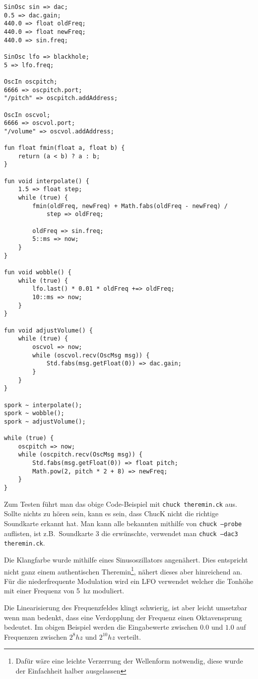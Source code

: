 \documentclass[a4paper, fontsize=12pt, toc=bibliographynumbered]{scrreprt}
\newcommand{\mono}[1]{\texttt{#1}}
\begin{document}
\begin{verbatim}
SinOsc sin => dac;
0.5 => dac.gain;
440.0 => float oldFreq;
440.0 => float newFreq;
440.0 => sin.freq;

SinOsc lfo => blackhole;
5 => lfo.freq;

OscIn oscpitch;
6666 => oscpitch.port;
"/pitch" => oscpitch.addAddress;

OscIn oscvol;
6666 => oscvol.port;
"/volume" => oscvol.addAddress;

fun float fmin(float a, float b) {
    return (a < b) ? a : b;
}

fun void interpolate() {
    1.5 => float step;
    while (true) {
        fmin(oldFreq, newFreq) + Math.fabs(oldFreq - newFreq) /
            step => oldFreq;

        oldFreq => sin.freq;
        5::ms => now;
    }
}

fun void wobble() {
    while (true) {
        lfo.last() * 0.01 * oldFreq +=> oldFreq;
        10::ms => now;
    }
}

fun void adjustVolume() {
    while (true) {
        oscvol => now;
        while (oscvol.recv(OscMsg msg)) {
            Std.fabs(msg.getFloat(0)) => dac.gain;
        }
    }
}

spork ~ interpolate();
spork ~ wobble();
spork ~ adjustVolume();

while (true) {
    oscpitch => now;
    while (oscpitch.recv(OscMsg msg)) {
        Std.fabs(msg.getFloat(0)) => float pitch;
        Math.pow(2, pitch * 2 + 8) => newFreq;
    }
}
\end{verbatim}

Zum Testen führt man das obige Code-Beispiel mit \mono{chuck
  theremin.ck} aus.  Sollte nichts zu hören sein, kann es sein, dass
ChucK nicht die richtige Soundkarte erkannt hat.  Man kann alle
bekannten mithilfe von \mono{chuck --probe} auflisten, ist
z.B.~Soundkarte 3 die erwünschte, verwendet man \mono{chuck --dac3
  theremin.ck}.

Die Klangfarbe wurde mithilfe eines Sinusoszillators angenähert.  Dies
entspricht nicht ganz einem authentischen Theremin\footnote{Dafür wäre
  eine leichte Verzerrung der Wellenform notwendig, diese wurde der
  Einfachheit halber ausgelassen}, nähert dieses aber hinreichend an.
Für die niederfrequente Modulation wird ein \ac{LFO} verwendet
welcher die Tonhöhe mit einer Frequenz von 5~hz moduliert.

Die Linearisierung des Frequenzfeldes klingt schwierig, ist aber
leicht umsetzbar wenn man bedenkt, dass eine Verdopplung der Frequenz
einen Oktavensprung bedeutet.  Im obigen Beispiel werden die
Eingabewerte zwischen $0.0$ und $1.0$ auf Frequenzen zwischen $2^8 hz$
und $2^{10} hz$ verteilt.
\end{document}

